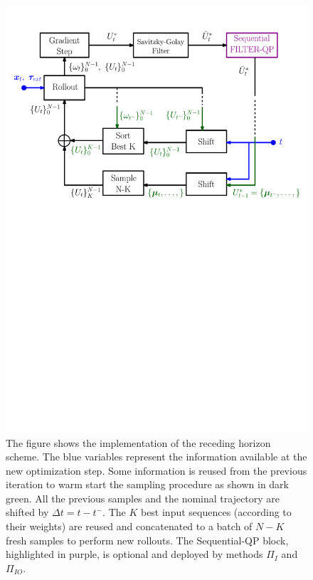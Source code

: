 \begin{figure}[t]
    \centering
    \includegraphics[width=\columnwidth]{figures/schemes/receding_horizon.pdf}
    \vspace{0.1cm}
    \caption{The figure shows the implementation of the receding horizon scheme. The blue variables represent the information available at the new optimization step. Some information is reused from the previous iteration to warm start the sampling procedure as shown in dark green. All the previous samples and the nominal trajectory are shifted by $\Delta t = t - t^-$. The $K$ best input sequences (according to their weights) are reused and concatenated to a batch of $N-K$ fresh samples to perform new rollouts. The Sequential-QP block, highlighted in purple, is optional and deployed by methods $\Pi_{I}$ and $\Pi_{IO}$.}
    \label{fig:receding_horizon}
\end{figure}

